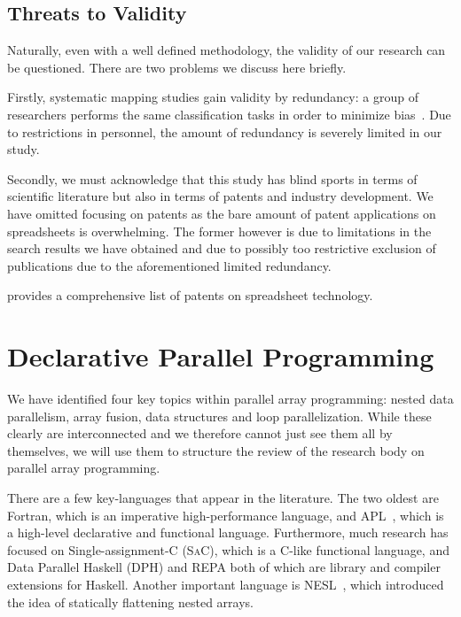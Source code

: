 \documentclass[a4paper]{article}
\newcommand{\sac}{S\textsc{a}C}
\begin{document}
\subsection{Threats to Validity}
\label{sec:threats-validity}

Naturally, even with a well defined methodology, the validity of our research can be questioned. There are two problems we discuss here briefly.

Firstly, systematic mapping studies gain validity by redundancy: a group of researchers performs the same classification tasks in order to minimize bias~\cite{keele2007guidelines}. Due to restrictions in personnel, the amount of redundancy is severely limited in our study.

Secondly, we must acknowledge that this study has blind sports in terms of scientific literature but also in terms of patents and industry development. We have omitted focusing on patents as the bare amount of patent applications on spreadsheets is overwhelming. The former however is due to limitations in the search results we have obtained and due to possibly too restrictive exclusion of publications due to the aforementioned limited redundancy.

\citet{Sestoft2014Spreadsheet} provides a comprehensive list of patents on spreadsheet technology.

\section{Declarative Parallel Programming}
\label{sec:declarative-parallel-programming}

We have identified four key topics within parallel array programming: nested data parallelism, array fusion, data structures and loop parallelization. While these clearly are interconnected and we therefore cannot just see them all by themselves, we will use them to structure the review of the research body on parallel array programming.

There are a few key-languages that appear in the literature. The two oldest are Fortran, which is an imperative high-performance language, and APL~\cite{Iverson1962Programming}, which is a high-level declarative and functional language. Furthermore, much research has focused on Single-assignment-C (\sac{}), which is a C-like functional language, and Data Parallel Haskell (DPH) and REPA both of which are library and compiler extensions for Haskell. Another important language is NESL~\cite{Blelloch1993NESL}, which introduced the idea of statically flattening nested arrays.
\end{document}
